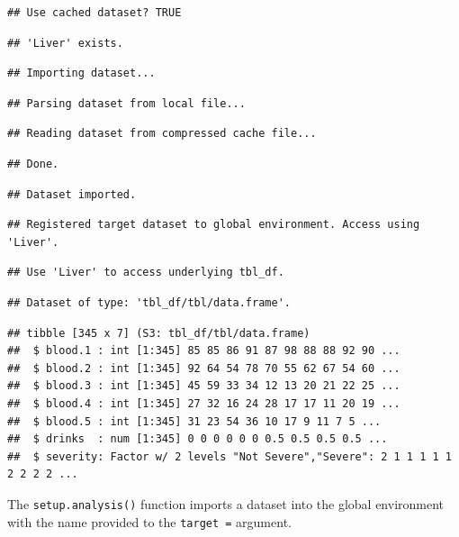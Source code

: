 \documentclass[
  11pt,
  a4paper,
]{scrartcl}
\begin{document}
\begin{verbatim}
## Use cached dataset? TRUE
\end{verbatim}

\begin{verbatim}
## 'Liver' exists.
\end{verbatim}

\begin{verbatim}
## Importing dataset...
\end{verbatim}

\begin{verbatim}
## Parsing dataset from local file...
\end{verbatim}

\begin{verbatim}
## Reading dataset from compressed cache file...
\end{verbatim}

\begin{verbatim}
## Done.
\end{verbatim}

\begin{verbatim}
## Dataset imported.
\end{verbatim}

\begin{verbatim}
## Registered target dataset to global environment. Access using 'Liver'.
\end{verbatim}

\begin{verbatim}
## Use 'Liver' to access underlying tbl_df.
\end{verbatim}

\begin{verbatim}
## Dataset of type: 'tbl_df/tbl/data.frame'.
\end{verbatim}

\begin{verbatim}
## tibble [345 x 7] (S3: tbl_df/tbl/data.frame)
##  $ blood.1 : int [1:345] 85 85 86 91 87 98 88 88 92 90 ...
##  $ blood.2 : int [1:345] 92 64 54 78 70 55 62 67 54 60 ...
##  $ blood.3 : int [1:345] 45 59 33 34 12 13 20 21 22 25 ...
##  $ blood.4 : int [1:345] 27 32 16 24 28 17 17 11 20 19 ...
##  $ blood.5 : int [1:345] 31 23 54 36 10 17 9 11 7 5 ...
##  $ drinks  : num [1:345] 0 0 0 0 0 0 0.5 0.5 0.5 0.5 ...
##  $ severity: Factor w/ 2 levels "Not Severe","Severe": 2 1 1 1 1 1 2 2 2 2 ...
\end{verbatim}

The \texttt{setup.analysis()} function imports a dataset into the global
environment with the name provided to the \texttt{target\ =} argument.
\end{document}
